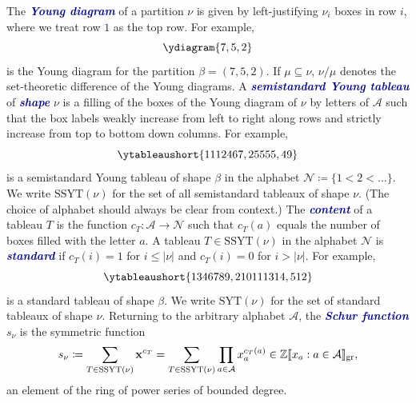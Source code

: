 \documentclass[12 pt]{amsart}
\newcommand{\newword}[1]{\textcolor{darkblue}{\textbf{\emph{#1}}}}
\newcommand{\Z}{\mathbb{Z}}
\newcommand{\cA}{\mathcal{A}}
\newcommand{\cN}{\mathcal{N}}
\newcommand{\SSYT}{\mathrm{SSYT}}
\newcommand{\SYT}{\mathrm{SYT}}
\theoremstyle{remark}
\numberwithin{equation}{section}
\begin{document}
The \newword{Young diagram} of a partition $\nu$ is given by left-justifying $\nu_i$ boxes in row $i$, where we treat row $1$ as the top row. 
For example, 
\[
\ydiagram{7,5,2}
\] 
is the Young diagram for the partition $\beta = (7,5,2)$. If $\mu \subseteq \nu$, $\nu / \mu$ denotes the set-theoretic difference of the Young diagrams.
A \newword{semistandard Young tableau} of \newword{shape} $\nu$ is a filling of the boxes of the Young diagram of $\nu$ by letters of $\cA$ such that the box labels weakly increase from left to right along rows and strictly increase from top to bottom down columns. For example,
\[
\ytableaushort{1112467,25555,49}
\]
is a semistandard Young tableau of shape $\beta$ in the alphabet $\cN \coloneqq \{1 < 2 < \dots \}$. We write $\SSYT(\nu)$ for the set of all semistandard tableaux of shape $\nu$. (The choice of alphabet should always be clear from context.) The \newword{content} of a tableau $T$ is the function $c_T : \cA \to \cN$ such that $c_T(a)$ equals the number of boxes filled with the letter $a$. A tableau $T \in \SSYT(\nu)$ in the alphabet $\cN$ is \newword{standard} if $c_T(i) = 1$ for $i \leq |\nu|$ and $c_T(i) = 0$ for $i > |\nu|$.
For example,
\[
\ytableaushort{1346789,
2{10}{11}{13}{14},
5{12}}
\]
is a standard tableau of shape $\beta$. We write $\SYT(\nu)$ for the set of standard tableaux of shape $\nu$. Returning to the arbitrary alphabet $\cA$, the \newword{Schur function} $s_\nu$ is the symmetric function 
\[
s_\nu \coloneqq \sum_{T \in \SSYT(\nu)} {\bf x}^{c_T} = \sum_{T \in \SSYT(\nu)} \prod_{a \in \cA} x_a^{c_T(a)} \in \Z\llbracket x_a : a \in \cA \rrbracket_{\rm gr},
\]
an element of the ring of power series of bounded degree.
\end{document}
